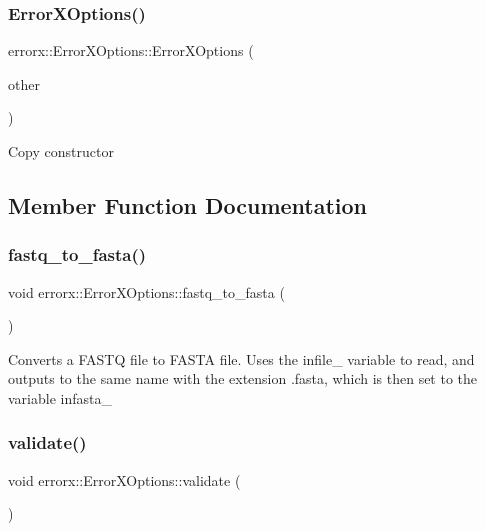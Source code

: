 \subsubsection{\texorpdfstring{Error\+X\+Options()}{ErrorXOptions()}\hspace{0.1cm}{\footnotesize\ttfamily [3/3]}}
{\footnotesize\ttfamily errorx\+::\+Error\+X\+Options\+::\+Error\+X\+Options (\begin{DoxyParamCaption}\item[{\mbox{\hyperlink{classerrorx_1_1_error_x_options}{Error\+X\+Options}} const \&}]{other }\end{DoxyParamCaption})}

Copy constructor 

\subsection{Member Function Documentation}
\mbox{\label{classerrorx_1_1_error_x_options_ac45f2c55e8c2dddbbceb5bbdc0acc06f}} 
\subsubsection{\texorpdfstring{fastq\+\_\+to\+\_\+fasta()}{fastq\_to\_fasta()}}
{\footnotesize\ttfamily void errorx\+::\+Error\+X\+Options\+::fastq\+\_\+to\+\_\+fasta (\begin{DoxyParamCaption}{ }\end{DoxyParamCaption})}

Converts a F\+A\+S\+TQ file to F\+A\+S\+TA file. Uses the infile\+\_\+ variable to read, and outputs to the same name with the extension .fasta, which is then set to the variable infasta\+\_\+ \mbox{\label{classerrorx_1_1_error_x_options_a8da4777cb965ad3ef9af136704e4fa62}} 
\subsubsection{\texorpdfstring{validate()}{validate()}}
{\footnotesize\ttfamily void errorx\+::\+Error\+X\+Options\+::validate (\begin{DoxyParamCaption}{ }\end{DoxyParamCaption})}

